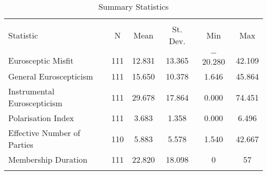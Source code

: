 
\begin{table}[!htbp] \centering 
  \caption{Summary Statistics} 
  \label{fig: summarystatistics} 
\begin{tabular}{@{\extracolsep{5pt}}lccccc} 
\\[-1.8ex]\hline 
\hline \\[-1.8ex] 
Statistic & \multicolumn{1}{c}{N} & \multicolumn{1}{c}{Mean} & \multicolumn{1}{c}{St. Dev.} & \multicolumn{1}{c}{Min} & \multicolumn{1}{c}{Max} \\ 
\hline \\[-1.8ex] 
Eurosceptic Misfit & 111 & 12.831 & 13.365 & $-$20.280 & 42.109 \\ 
General Euroscepticism & 111 & 15.650 & 10.378 & 1.646 & 45.864 \\ 
Instrumental Euroscepticism & 111 & 29.678 & 17.864 & 0.000 & 74.451 \\ 
Polarisation Index & 111 & 3.683 & 1.358 & 0.000 & 6.496 \\ 
Effective Number of Parties & 110 & 5.883 & 5.578 & 1.540 & 42.667 \\ 
Membership Duration & 111 & 22.820 & 18.098 & 0 & 57 \\ 
\hline \\[-1.8ex] 
\end{tabular} 
\end{table} 
